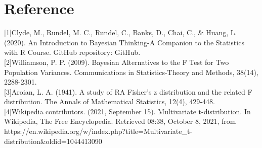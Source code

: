\documentclass[11pt]{article}
\begin{document}
    \hypertarget{reference}{%
\section{Reference}\label{reference}}

    {[}1{]}Clyde, M., Rundel, M. C., Rundel, C., Banks, D., Chai, C., \&
Huang, L. (2020). An Introduction to Bayesian Thinking-A Companion to
the Statistics with R Course. GitHub repository: GitHub.\\
{[}2{]}Williamson, P. P. (2009). Bayesian Alternatives to the F Test for
Two Population Variances. Communications in Statistics-Theory and
Methods, 38(14), 2288-2301.\\
{[}3{]}Aroian, L. A. (1941). A study of RA Fisher's z distribution and
the related F distribution. The Annals of Mathematical Statistics,
12(4), 429-448.\\
{[}4{]}Wikipedia contributors. (2021, September 15). Multivariate
t-distribution. In Wikipedia, The Free Encyclopedia. Retrieved 08:38,
October 8, 2021, from
https://en.wikipedia.org/w/index.php?title=Multivariate\_t-distribution\&oldid=1044413090


    
    
    
\end{document}
